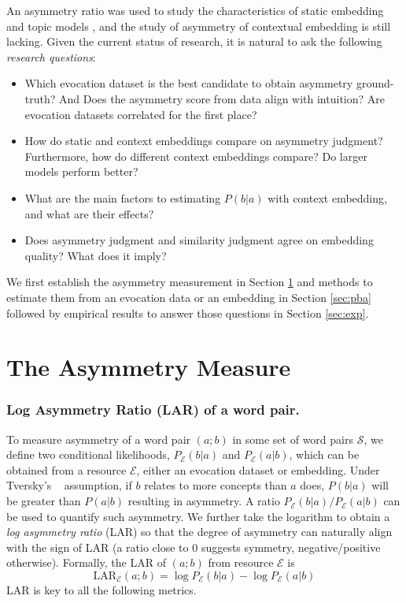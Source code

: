 \documentclass[letterpaper]{article} %
\begin{document}
An asymmetry ratio was used to study the characteristics of static embedding \cite{nematzadeh2017evaluating} and topic models \cite{griffiths2007topics}, and the study of asymmetry of contextual embedding is still lacking. Given the current status of research, it is natural to ask the following \textit{research questions}:
\begin{itemize}
    \item 
     Which evocation dataset is the best candidate to obtain asymmetry ground-truth? And  Does the asymmetry score from data align with intuition?  Are evocation datasets correlated for the first place? 
    \item
     How do static and context embeddings compare on asymmetry judgment? Furthermore, how do different context embeddings compare? Do larger models perform better?
    \item
     What are the main factors to estimating $P(b|a)$ with context embedding, and what are their effects?
    \item
     Does asymmetry judgment and similarity judgment agree on embedding quality? What does it imply?
\end{itemize}

We first establish the asymmetry measurement in Section \ref{sec:asy_measure} and methods to estimate them from an evocation data or an embedding in Section \ref{sec:pba} followed by empirical results to answer those questions in Section \ref{sec:exp}.

\section{The Asymmetry Measure} 
\label{sec:asy_measure}
\subsubsection{Log Asymmetry Ratio (LAR) of a word pair.} To measure asymmetry of a word pair $(a;b)$ in some set of word pairs $\mathcal{S}$, we define two conditional likelihoods, $P_\mathcal{E}(b|a)$ and $P_\mathcal{E}(a|b)$, which can be obtained from a resource $\mathcal{E}$, either an evocation dataset or embedding. Under Tversky's ~ assumption, if $b$ relates to more concepts than $a$ does, $P(b|a)$ will be greater than $P(a|b)$ resulting in asymmetry. A ratio $P_\mathcal{E}(b|a)/P_\mathcal{E}(a|b)$ \cite{griffiths2007topics} can be used to quantify such asymmetry. We further take the logarithm to obtain a \textit{log asymmetry ratio} (LAR) so that the degree of asymmetry can naturally align with the sign of LAR (a ratio close to 0 suggests symmetry, negative/positive otherwise). Formally, the LAR of $(a;b)$ from resource $\mathcal{E}$ is 
\begin{equation}
\label{eq:lar}
    \mbox{LAR}_\mathcal{E}(a;b) = \log P_\mathcal{E}(b|a) - \log P_\mathcal{E}(a|b)
\end{equation}
LAR is key to all the following metrics.
\end{document}
